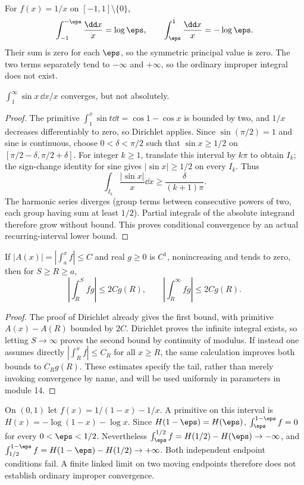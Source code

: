 \begin{example}
For $f(x)=1/x$ on $[-1,1]\setminus\{0\}$,
\[\int_{-1}^{-\eps}\frac{\dd x}{x}=\log\eps,\qquad
\int_\eps^1\frac{\dd x}{x}=-\log\eps.
\]
Their sum is zero for each $\eps$, so the symmetric principal value
is zero. The two terms separately tend to $-\infty$ and $+\infty$,
so the ordinary improper integral does not exist.
\end{example}

\begin{example}
$\int_1^\infty\sin x\,\dd x/x$ converges, but not absolutely.
\end{example}
\begin{proof}
The primitive $\int_1^x\sin t\dd t=\cos1-\cos x$ is bounded by two,
and $1/x$ decreases differentiably to zero, so Dirichlet applies.
Since $\sin(\pi/2)=1$ and sine is continuous, choose
$0<\delta<\pi/2$ such that $\sin x\ge1/2$ on
$[\pi/2-\delta,\pi/2+\delta]$. For integer $k\ge1$, translate this
interval by $k\pi$ to obtain $I_k$; the sign-change identity for sine
gives $|\sin x|\ge1/2$ on every $I_k$. Thus
\[\int_{I_k}\frac{|\sin x|}{x}\dd x
\ge\frac{\delta}{(k+1)\pi}.
\]
The harmonic series diverges (group terms between consecutive powers of
two, each group having sum at least $1/2$). Partial integrals of the
absolute integrand therefore grow without bound. This proves conditional
convergence by an actual recurring-interval lower bound.
\end{proof}

\begin{theorem}
If $|A(x)|=|\int_a^xf|\le C$ and real $g\ge0$ is $C^1$,
nonincreasing and tends to zero, then for $S\ge R\ge a$,
\[\left|\int_R^Sfg\right|\le2Cg(R),\qquad
\left|\int_R^\infty fg\right|\le2Cg(R).
\]
\end{theorem}
\begin{proof}
The proof of Dirichlet already gives the first bound, with primitive
$A(x)-A(R)$ bounded by $2C$. Dirichlet proves the infinite integral
exists, so letting $S\to\infty$ proves the second bound by continuity
of modulus. If instead one assumes directly
$|\int_R^xf|\le C_R$ for all $x\ge R$, the same calculation improves
both bounds to $C_Rg(R)$. These estimates specify the tail, rather than
merely invoking convergence by name, and will be used uniformly in
parameters in module 14.
\end{proof}

\begin{example}
On $(0,1)$ let $f(x)=1/(1-x)-1/x$. A primitive on this interval is
$H(x)=-\log(1-x)-\log x$. Since $H(1-\eps)=H(\eps)$,
$\int_\eps^{1-\eps}f=0$ for every $0<\eps<1/2$.
Nevertheless
$\int_\eps^{1/2}f=H(1/2)-H(\eps)\to-\infty$,
and
$\int_{1/2}^{1-\eps}f=H(1-\eps)-H(1/2)\to+\infty$.
Both independent endpoint conditions fail. A finite linked limit on two
moving endpoints therefore does not establish ordinary improper convergence.
\end{example}
